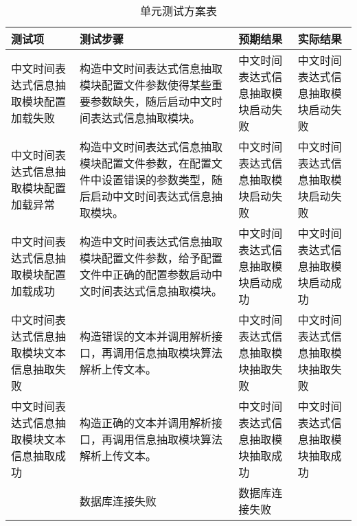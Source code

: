 \begin{table}[h]
    \centering
    \caption{单元测试方案表}
    \begin{tabularx}{\linewidth}{|Y|Y|Y|Y|}
        \hline
        测试项                                     & 测试步骤                                                                                                         & 预期结果                                                   & 实际结果                                                     \\
        \hline
        中文时间表达式信息抽取模块配置加载失败     & 构造中文时间表达式信息抽取模块配置文件参数使得某些重要参数缺失，随后启动中文时间表达式信息抽取模块。             & 中文时间表达式信息抽取模块启动失败                         & 中文时间表达式信息抽取模块启动失败                           \\
        \hline
        中文时间表达式信息抽取模块配置加载异常     & 构造中文时间表达式信息抽取模块配置文件参数，在配置文件中设置错误的参数类型，随后启动中文时间表达式信息抽取模块。 & 中文时间表达式信息抽取模块启动失败                         & 中文时间表达式信息抽取模块启动失败                           \\
        \hline
        中文时间表达式信息抽取模块配置加载成功     & 构造中文时间表达式信息抽取模块配置文件参数，给予配置文件中正确的配置参数启动中文时间表达式信息抽取模块。         & 中文时间表达式信息抽取模块启动成功                         & 中文时间表达式信息抽取模块启动成功                           \\
        \hline
        中文时间表达式信息抽取模块文本信息抽取失败 & 构造错误的文本并调用解析接口，再调用信息抽取模块算法解析上传文本。                                               & 中文时间表达式信息抽取模块抽取失败                         & 中文时间表达式信息抽取模块抽取失败                           \\
        \hline
        中文时间表达式信息抽取模块文本信息抽取成功 & 构造正确的文本并调用解析接口，再调用信息抽取模块算法解析上传文本。                                               & 中文时间表达式信息抽取模块抽取成功                         & 中文时间表达式信息抽取模块抽取成功                           \\                                                                & 数据库连接失败                                             & 数据库连接失败                                               \\
        \hline
    \end{tabularx}
    \label{tab:unit_test}
\end{table}



